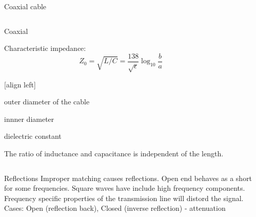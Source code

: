 \documentclass{beamer}
\begin{document}
\begin{frame}[label=coaxial]{Coaxial cable}
\begin{columns}
  \begin{column}{0.48\textwidth}
    Coaxial

    Characteristic impedance:
    \begin{equation*} %
      Z_0 = \sqrt{L/C} = \frac{138}{\sqrt{\epsilon}}\log_{10}{\frac{b}{a}}
    \end{equation*}
    \begin{description}
      [align left]
      \item[$a$] outer diameter of the cable
      \item[$b$] innner diameter
      \item[$\epsilon$] dielectric constant
    \end{description}
    The ratio of inductance and capacitance is independent of the length.
  \end{column}
  \begin{column}{0.48\textwidth}
  \end{column}
\end{columns}
\end{frame}

\begin{frame}{Reflections}
Improper matching causes reflections.
Open end behaves as a short for some frequencies.
Square waves have include high frequency components. Frequency specific properties of the transmission line will distord the signal.
Cases: Open (reflection back), Closed (inverse reflection) - attenuation
\end{frame}
\end{document}
